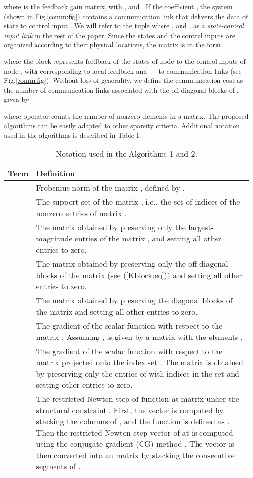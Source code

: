 \documentclass[12pt, draftclsnofoot,onecolumn]{IEEEtran}
\begin{document}
\noindent where  is the feedback gain matrix, with , and . If the coefficient , the system (shown in Fig.\ref{comm:fig}) contains a communication link that delivers the data of state  to control input . We will refer to the tuple  where , and , as a
{\it state-control input link} in the rest of the paper. Since the states  and the control inputs  are organized according to their physical locations, the matrix  is in the form

where the block  represents feedback of the states of node  to the control inputs of node , with  corresponding to local feedback and  --- to communication links (see Fig.\ref{comm:fig}). Without loss of generality, we define the communication cost as the number of communication links associated with the off-diagonal blocks of , given by

\noindent where  operator counts the number of nonzero elements in a matrix. The proposed algorithms can be easily adapted to other sparsity criteria. Additional notation used in the algorithms is described in Table I.

\begin{table}[!b]
\centering
\caption{Notation used in the Algorithms 1 and 2.}
\begin{tabular}{p{}p{}}
\hline
{\bf Term} & {\bf Definition}\\
\hline
 & Frobenius norm of the matrix , defined by . \\
\hline
 & The support set of the matrix , i.e., the set of indices of the nonzero entries of matrix  \cite{bahmani2013greedy}.\\
\hline
 & The matrix obtained by preserving only the  largest-magnitude entries of the matrix , and setting all other entries to zero. \\
\hline 
 & The matrix obtained by preserving only the off-diagonal blocks of the matrix  (see (\ref{Kblock:eq})) and setting all other entries to zero. \\
\hline
 & The matrix obtained by preserving the diagonal blocks of the matrix  and setting all other entries to zero.\\
\hline
 & The gradient of the scalar function  with respect to the matrix  \cite{rautert1997computational}. Assuming ,  is given by a  matrix with the elements  .\\ 
\hline
 & The gradient of the scalar function  with respect to the matrix  projected onto the index set . The matrix  is obtained by preserving only the entries of  with indices in the set  and setting other entries to zero. \\
\hline
 & The restricted Newton step of function  at matrix  under the structural constraint . First, the  vector  is computed by stacking the columns of , and the function  is defined as . Then the  restricted Newton step vector  of  at  \cite{bahmani2013greedy} is computed using the conjugate gradient (CG) method \cite{lin2013design}. The vector  is then converted into an  matrix by stacking the consecutive  segments of .\\
\hline
\end{tabular}
\label{notation:tb}
\end{table}
\end{document}
